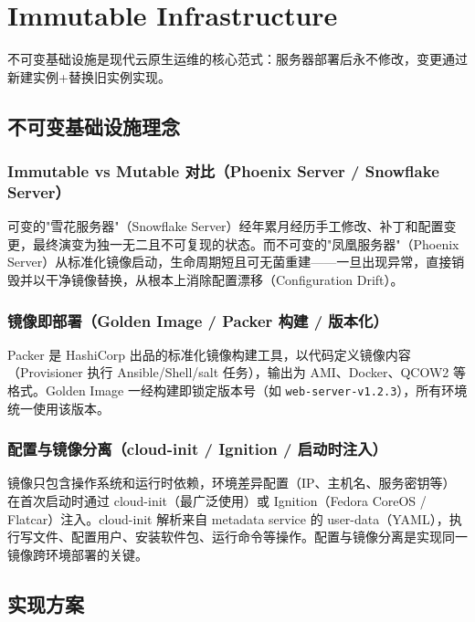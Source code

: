 \documentclass[12pt,UTF8]{ctexbook}
\begin{document}
\chapter{Immutable Infrastructure}
\label{chap:immutable-infra}

不可变基础设施是现代云原生运维的核心范式：服务器部署后永不修改，变更通过新建实例+替换旧实例实现。

  \section{不可变基础设施理念}
    \subsection{Immutable vs Mutable 对比（Phoenix Server / Snowflake Server）}

可变的"雪花服务器"（Snowflake Server）经年累月经历手工修改、补丁和配置变更，最终演变为独一无二且不可复现的状态。而不可变的"凤凰服务器"（Phoenix Server）从标准化镜像启动，生命周期短且可无菌重建——一旦出现异常，直接销毁并以干净镜像替换，从根本上消除配置漂移（Configuration Drift）。

    \subsection{镜像即部署（Golden Image / Packer 构建 / 版本化）}

Packer 是 HashiCorp 出品的标准化镜像构建工具，以代码定义镜像内容（Provisioner 执行 Ansible/Shell/salt 任务），输出为 AMI、Docker、QCOW2 等格式。Golden Image 一经构建即锁定版本号（如 \verb|web-server-v1.2.3|），所有环境统一使用该版本。

    \subsection{配置与镜像分离（cloud-init / Ignition / 启动时注入）}

镜像只包含操作系统和运行时依赖，环境差异配置（IP、主机名、服务密钥等）在首次启动时通过 cloud-init（最广泛使用）或 Ignition（Fedora CoreOS / Flatcar）注入。cloud-init 解析来自 metadata service 的 user-data（YAML），执行写文件、配置用户、安装软件包、运行命令等操作。配置与镜像分离是实现同一镜像跨环境部署的关键。

  \section{实现方案}
\end{document}
